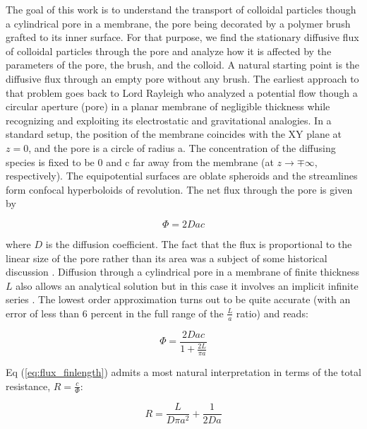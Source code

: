 The goal of this work is to understand the transport of colloidal particles though a cylindrical pore in a membrane, the pore being decorated by a polymer brush grafted to its inner surface. For that purpose, we find the stationary diffusive flux of colloidal particles through the pore and analyze how it is affected by the parameters of the pore, the brush, and the colloid. A natural starting point is the diffusive flux through an empty pore without any brush. The earliest approach to that problem goes back to Lord Rayleigh who analyzed a potential flow though a circular aperture (pore) in a planar membrane of negligible thickness while recognizing and exploiting its electrostatic and gravitational analogies\cite{Strutt1878}.  In a standard setup, the position of the membrane coincides with the XY plane at  $z=0$, and the pore is a circle of radius a. The concentration of the diffusing species is fixed to be 0 and c far away from the membrane (at   $z\rightarrow\mp\infty$, respectively).  The equipotential surfaces are oblate spheroids and the streamlines form confocal hyperboloids of revolution\cite{Cooke1966}.
The net flux through the pore is given by


\begin{equation}
\Phi=2Dac\label{eq:flux_Ral}
\end{equation}

\noindent where $D$ is the diffusion coefficient. The fact that the flux is proportional to the linear size of the pore rather than its area was a subject of some historical discussion \cite{Cooke1966}.
Diffusion through a cylindrical pore in a membrane of finite thickness $L$ also allows an analytical solution but in this case it involves an implicit infinite series \cite{Brunn1984}. The lowest order approximation turns out to be quite accurate (with an error of less than 6 percent in the full range of the $\frac{L}{a}$ ratio) and reads:

\begin{equation}
    \Phi=\frac{2Dac}{1+\frac{2L}{\pi a}}\label{eq:flux_finlength}
\end{equation}

Eq (\ref{eq:flux_finlength}) admits a most natural interpretation in terms of the total resistance, $R=\frac{c}{\Phi}$:

\begin{equation}
R=\frac{L}{D\pi a^{2}}+\frac{1}{2Da}\label{eq:resistance}
\end{equation}

